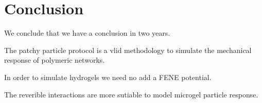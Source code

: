 \chapter{Conclusion}

We conclude that we have a conclusion in two years.

The patchy particle protocol is a vlid methodology to simulate the mechanical response of polymeric networks.

In order to simulate hydrogels we need no add a FENE potential.

The reverible interactions are more sutiable to model microgel particle response.


